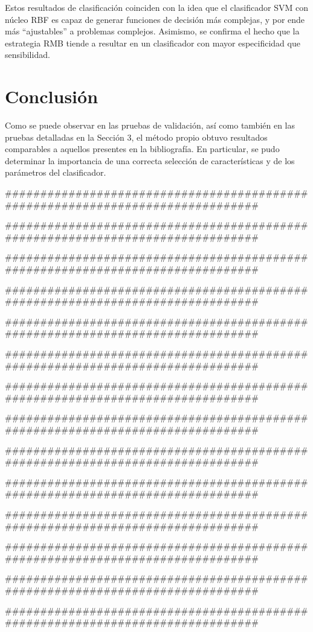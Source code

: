 Estos resultados de clasificación coinciden con la idea que el
clasificador SVM con núcleo RBF es capaz de generar funciones de
decisión más complejas, y por ende más ``ajustables'' a problemas
complejos. Asimismo, se confirma el hecho que la estrategia RMB tiende
a resultar en un clasificador con mayor especificidad que
sensibilidad.

\chapter{Conclusión}
Como se puede observar en las pruebas de validación,
así como también en las pruebas detalladas en la Sección 3,
el método propio obtuvo resultados comparables
a aquellos presentes en la bibliografía.
En particular, se pudo determinar la importancia de una correcta
selección de características y de los parámetros del clasificador.

\printbibliography

###############################################################################

###############################################################################

###############################################################################

###############################################################################

###############################################################################

###############################################################################

###############################################################################

###############################################################################

###############################################################################

###############################################################################

###############################################################################

###############################################################################

###############################################################################

###############################################################################

